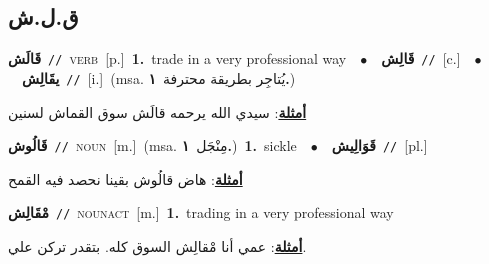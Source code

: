 \documentclass[10pt,a4paper,twoside]{article} %
\begin{document}
\begin{multicols}{2}
\vspace{-3mm}
\subsection*{\color{blue}\foreignlanguage{arabic}{ق.ل.ش}\color{blue}{}} 

{\setlength\topsep{0pt}\textbf{\foreignlanguage{arabic}{قَالَش}}\ {\color{gray}\texttt{//}\color{black}}\ \textsc{verb}\ [p.]\ \textbf{1.}~trade in a very professional way\ \ $\bullet$\ \ \setlength\topsep{0pt}\textbf{\foreignlanguage{arabic}{قَالِش}}\ {\color{gray}\texttt{//}\color{black}}\ [c.]\ \ $\bullet$\ \ \setlength\topsep{0pt}\textbf{\foreignlanguage{arabic}{يقَالِش}}\ {\color{gray}\texttt{//}\color{black}}\ [i.]\ \color{gray}(msa. \foreignlanguage{arabic}{يُتاجِر بطريقة محترفة}~\foreignlanguage{arabic}{\textbf{١.}})\color{black}\  \begin{flushright}\color{gray}\foreignlanguage{arabic}{\textbf{\underline{\foreignlanguage{arabic}{أمثلة}}}: سيدي الله يرحمه قالَش سوق القماش لسنين}\end{flushright}\color{black}} \vspace{2mm}

{\setlength\topsep{0pt}\textbf{\foreignlanguage{arabic}{قَالُوش}}\ {\color{gray}\texttt{//}\color{black}}\ \textsc{noun}\ [m.]\ \color{gray}(msa. \foreignlanguage{arabic}{مِنْجَل}~\foreignlanguage{arabic}{\textbf{١.}})\color{black}\ \textbf{1.}~sickle\ \ $\bullet$\ \ \setlength\topsep{0pt}\textbf{\foreignlanguage{arabic}{قَوَالِيش}}\ {\color{gray}\texttt{//}\color{black}}\ [pl.]\  \begin{flushright}\color{gray}\foreignlanguage{arabic}{\textbf{\underline{\foreignlanguage{arabic}{أمثلة}}}: هاض قالُوش بقينا نحصد فيه القمح}\end{flushright}\color{black}} \vspace{2mm}

{\setlength\topsep{0pt}\textbf{\foreignlanguage{arabic}{مْقَالِش}}\ {\color{gray}\texttt{//}\color{black}}\ \textsc{noun\textunderscore act}\ [m.]\ \textbf{1.}~trading in a very professional way\  \begin{flushright}\color{gray}\foreignlanguage{arabic}{\textbf{\underline{\foreignlanguage{arabic}{أمثلة}}}: عمي أنا مْقالِش السوق كله. بتقدر تركن علي.}\end{flushright}\color{black}} \vspace{2mm}


\end{multicols}
\end{document}
